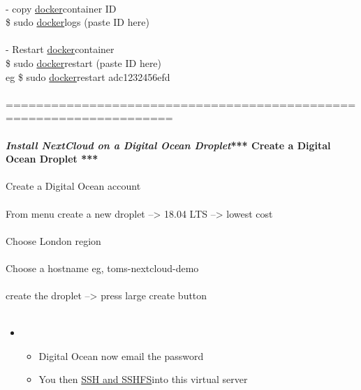 \documentclass[10pt,a4paper]{article}
\begin{document}
{\\
		- copy \hyperlink{docker}{docker}}{\large  container ID\\
			\$ sudo \hyperlink{docker}{docker}}{\large  logs (paste ID here)\\
\\
		- Restart \hyperlink{docker}{docker}}{\large  container\\
			\$ sudo \hyperlink{docker}{docker}}{\large  restart (paste ID here)\\
			eg \$ sudo \hyperlink{docker}{docker}}{\large  restart adc1232456efd\\
\\
====================================================================\\
\\
}\textbf{\textit{{\Large Install NextCloud on a Digital Ocean Droplet}}}{\large \textbf{*** Create a Digital Ocean Droplet ***}}{\large \\
\\
	Create a Digital Ocean account\\
\\
	From menu create a new droplet --> 18.04 LTS --> lowest cost\\
\\
	Choose London region\\
\\
	Choose a hostname eg, toms-nextcloud-demo\\
\\
	create the droplet --> press large create button\\
\\
}
\begin{itemize}
\item 
\begin{itemize}
\item {\large Digital Ocean now email the password}
\item {\large You then \hyperlink{ssh___and_sshfs}{SSH   and SSHFS}}{\large  into this virtual server}
\end{itemize}

\end{itemize}
\end{document}

